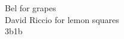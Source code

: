 \documentclass[preview]{standalone}
\begin{document}
Bel for grapes\\David Riccio for lemon squares\\3b1b\\
\end{document}
